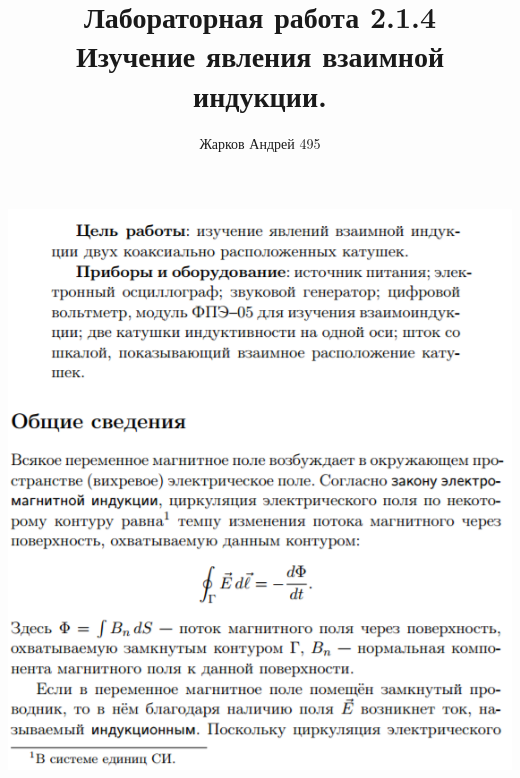 \documentclass[12pt]{article}
\begin{document}
    \author {Жарков Андрей 495}
    \title {Лабораторная работа 2.1.4 \\  Изучение явления взаимной индукции.}
    \maketitle{}
    
    \begin{center}
    	\includegraphics[width=15cm]{theory1.png}

\end{center}
\end{document}
